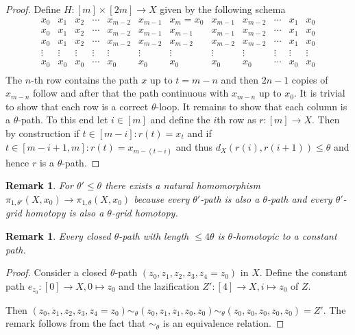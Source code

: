 \documentclass[a4paper, 11pt, twoside]{article}
\theoremstyle{break}
\theoremstyle{break}
\newtheorem{rem}[thm]{Remark}
\begin{document}
\begin{proof}
  Define $H\colon [m] \times [2m] \to X$ given by the following schema
  \begin{equation*}
    \begin{matrix}
      x_0 & x_1 & x_2 & \cdots & x_{m-2} & x_{m-1} & x_m = x_0 & x_{m-1} & x_{m-2} & \cdots & x_1 & x_0 \\
      x_0 & x_1 & x_2 & \cdots & x_{m-2} & x_{m-1} & x_{m-1} & x_{m-1} & x_{m-2} & \cdots & x_1 & x_0 \\
      x_0 & x_1 & x_2 & \cdots & x_{m-2} & x_{m-2} & x_{m-2} & x_{m-2} & x_{m-2} & \cdots & x_1 & x_0 \\
      \vdots & \vdots & \vdots & \vdots & \vdots & \vdots & \vdots & \vdots & \vdots & \vdots & \vdots & \vdots \\
      x_0 & x_0 & x_0 & \cdots & x_0 & x_0 & x_0 & x_0 & x_0 & \cdots & x_0 & x_0 \\
    \end{matrix}
  \end{equation*}
  The $n$-th row contains the path $x$ up to $t = m-n$ and then $2n-1$ copies of $x_{m-n}$ follow and after that the path continuous with $x_{m-n}$ up to $x_0$.
  It is trivial to show that each row is a correct $\theta$-loop. It remains to show that each column is a $\theta$-path. To this end let $i \in [m]$ and define the $i$th row as $r\colon [m] \to X$.
  Then by construction if $t \in [m-i]\colon r(t) = x_t$ and if $t \in [m-i+1, m]\colon r(t) = x_{m-(t-i)}$ 
  and thus $d_X(r(i), r(i+1)) \leq \theta$ and hence $r$ is a $\theta$-path.
\end{proof}

\begin{rem}
  For $\theta' \leq \theta$ there exists a natural homomorphism $\pi_{1,\theta'}(X, x_0) \to \pi_{1,\theta}(X, x_0)$ 
  because every $\theta'$-path is also a $\theta$-path and every $\theta'$-grid homotopy is also a $\theta$-grid homotopy.
\end{rem}

\begin{rem}
  Every closed $\theta$-path with length $\leq 4\theta$ is $\theta$-homotopic to a constant path.

  \cite[p. 4]{vigolo2018fundamental}
\end{rem}

\begin{proof}
  Consider a closed $\theta$-path $(z_0, z_1, z_2, z_3, z_4 = z_0)$ in $X$. 
  Define the constant path $e_{z_0}\colon [0] \to X, 0 \mapsto z_0$ and the lazification $Z': [4] \to X, i \mapsto z_0$ of $Z$.

  Then $(z_0, z_1, z_2, z_3, z_4 = z_0) \sim_{\theta} (z_0, z_1, z_1, z_0, z_0)\sim_{\theta} (z_0, z_0, z_0, z_0, z_0) = Z'$. The remark follows from the fact that $\sim_{\theta}$ is an equivalence relation.
\end{proof}
\end{document}
